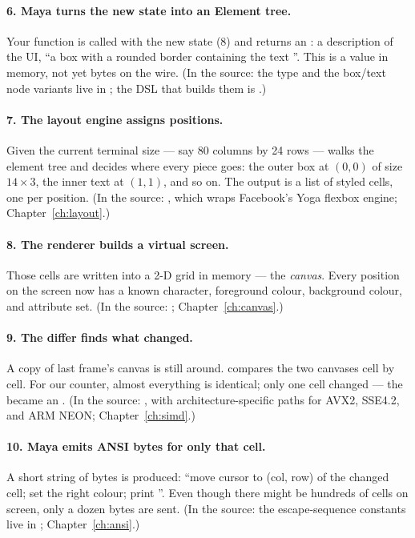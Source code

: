 \paragraph{6. Maya turns the new state into an Element tree.}
Your  function is called with the new state ($8$) and
returns an : a description of the UI, ``a box with a
rounded border containing the text ''. This is a
value in memory, not yet bytes on the wire. (In the source: the
 type and the box/text node variants live in
; the DSL that builds them is
.)

\paragraph{7. The layout engine assigns positions.}
Given the current terminal size --- say 80 columns by 24 rows ---
\maya{} walks the element tree and decides where every piece goes:
the outer box at $(0, 0)$ of size $14 \times 3$, the inner text at
$(1, 1)$, and so on. The output is a list of styled cells, one per
position. (In the source: , which
wraps Facebook's Yoga flexbox engine; Chapter~\ref{ch:layout}.)

\paragraph{8. The renderer builds a virtual screen.}
Those cells are written into a 2-D grid in memory --- the
\emph{canvas}. Every position on the screen now has a known
character, foreground colour, background colour, and attribute set.
(In the source: ;
Chapter~\ref{ch:canvas}.)

\paragraph{9. The differ finds what changed.}
A copy of last frame's canvas is still around. \maya{} compares the
two canvases cell by cell. For our counter, almost everything is
identical; only one cell changed --- the  became an .
(In the source: , with
architecture-specific paths for AVX2, SSE4.2, and ARM NEON;
Chapter~\ref{ch:simd}.)

\paragraph{10. Maya emits ANSI bytes for only that cell.}
A short string of bytes is produced: ``move cursor to (col, row)
of the changed cell; set the right colour; print ''. Even
though there might be hundreds of cells on screen, only a dozen
bytes are sent. (In the source: the escape-sequence constants live
in ;
Chapter~\ref{ch:ansi}.)

